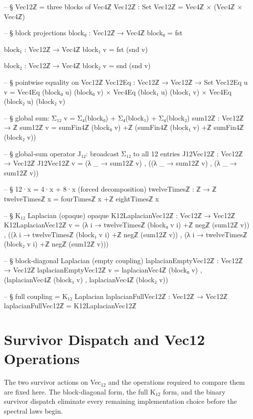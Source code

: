\documentclass[11pt,a4paper]{book}
\def\texorpdfstring#1#2{#2}%
\begin{document}
\begin{code}
-- § Vec12ℤ = three blocks of Vec4ℤ
Vec12ℤ : Set
Vec12ℤ = Vec4ℤ × (Vec4ℤ × Vec4ℤ)

-- § block projections
block₀ : Vec12ℤ → Vec4ℤ
block₀ = fst

block₁ : Vec12ℤ → Vec4ℤ
block₁ v = fst (snd v)

block₂ : Vec12ℤ → Vec4ℤ
block₂ v = snd (snd v)

-- § pointwise equality on Vec12ℤ
Vec12Eq : Vec12ℤ → Vec12ℤ → Set
Vec12Eq u v = Vec4Eq (block₀ u) (block₀ v) × Vec4Eq (block₁ u) (block₁ v) × Vec4Eq (block₂ u) (block₂ v)

-- § global sum: Σ₁₂ v = Σ₄(block₀) + Σ₄(block₁) + Σ₄(block₂)
sum12ℤ : Vec12ℤ → ℤ
sum12ℤ v = sumFin4ℤ (block₀ v) +ℤ (sumFin4ℤ (block₁ v) +ℤ sumFin4ℤ (block₂ v))

-- § global-sum operator J₁₂: broadcast Σ₁₂ to all 12 entries
J12Vec12ℤ : Vec12ℤ → Vec12ℤ
J12Vec12ℤ v = (λ _ → sum12ℤ v) , ((λ _ → sum12ℤ v) , (λ _ → sum12ℤ v))

-- § 12·x = 4·x + 8·x (forced decomposition)
twelveTimesℤ : ℤ → ℤ
twelveTimesℤ x = fourTimesℤ x +ℤ eightTimesℤ x

-- § K₁₂ Laplacian (opaque)
opaque
  K12LaplacianVec12ℤ : Vec12ℤ → Vec12ℤ
  K12LaplacianVec12ℤ v =
    (λ i → twelveTimesℤ (block₀ v i) +ℤ negℤ (sum12ℤ v)) ,
    ((λ i → twelveTimesℤ (block₁ v i) +ℤ negℤ (sum12ℤ v)) ,
     (λ i → twelveTimesℤ (block₂ v i) +ℤ negℤ (sum12ℤ v)))

-- § block-diagonal Laplacian (empty coupling)
laplacianEmptyVec12ℤ : Vec12ℤ → Vec12ℤ
laplacianEmptyVec12ℤ v = laplacianVec4ℤ (block₀ v) , (laplacianVec4ℤ (block₁ v) , laplacianVec4ℤ (block₂ v))

-- § full coupling = K₁₂ Laplacian
laplacianFullVec12ℤ : Vec12ℤ → Vec12ℤ
laplacianFullVec12ℤ = K12LaplacianVec12ℤ
\end{code}

\section{Survivor Dispatch and Vec\texorpdfstring{$_{12}$}{12} Operations}

The two survivor actions on Vec$_{12}$ and the operations
required to compare them are fixed here. The block-diagonal form, the full K$_{12}$ form,
and the binary survivor dispatch eliminate every remaining implementation
choice before the spectral laws begin.
\end{document}
